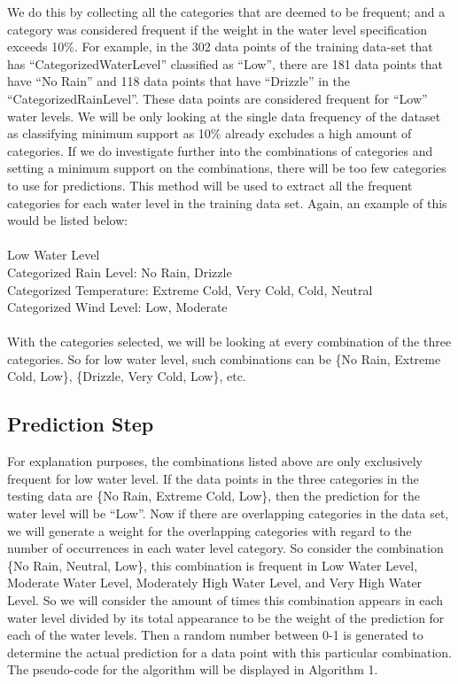 \documentclass[10pt, conference, compsocconf]{IEEEtran}
\begin{document}
We do this by collecting all the categories that are deemed to be frequent; and a category was considered frequent if the weight in the water level specification exceeds 10\%. For example, in the 302 data points of the training data-set that has “CategorizedWaterLevel” classified as “Low”, there are 181 data points that have “No Rain” and 118 data points that have “Drizzle” in the “CategorizedRainLevel”. These data points are considered frequent for “Low” water levels. We will be only looking at the single data frequency of the dataset as classifying minimum support as 10\% already excludes a high amount of categories. If we do investigate further into the combinations of categories and setting a minimum support on the combinations, there will be too few categories to use for predictions.
This method will be used to extract all the frequent categories for each water level in the training data set. Again, an example of this would be listed below:\\
\\
Low Water Level\\
Categorized Rain Level: No Rain, Drizzle\\
Categorized Temperature: Extreme Cold, Very Cold, Cold, Neutral\\
Categorized Wind Level: Low, Moderate\\
\\
With the categories selected, we will be looking at every combination of the three categories. So for low water level, such combinations can be \{No Rain, Extreme Cold, Low\}, \{Drizzle, Very Cold, Low\}, etc. 

\subsection{Prediction Step}
For explanation purposes, the combinations listed above are only exclusively frequent for low water level. If the data points in the three categories in the testing data are \{No Rain, Extreme Cold, Low\}, then the prediction for the water level will be “Low”. Now if there are overlapping categories in the data set, we will generate a weight for the overlapping categories with regard to the number of occurrences in each water level category. So consider the combination \{No Rain, Neutral, Low\}, this combination is frequent in Low Water Level, Moderate Water Level, Moderately High Water Level, and Very High Water Level. So we will consider the amount of times this combination appears in each water level divided by its total appearance to be the weight of the prediction for each of the water levels. Then a random number between 0-1 is generated to determine the actual prediction for a data point with this particular combination. The pseudo-code for the algorithm will be displayed in Algorithm 1.
\end{document}
